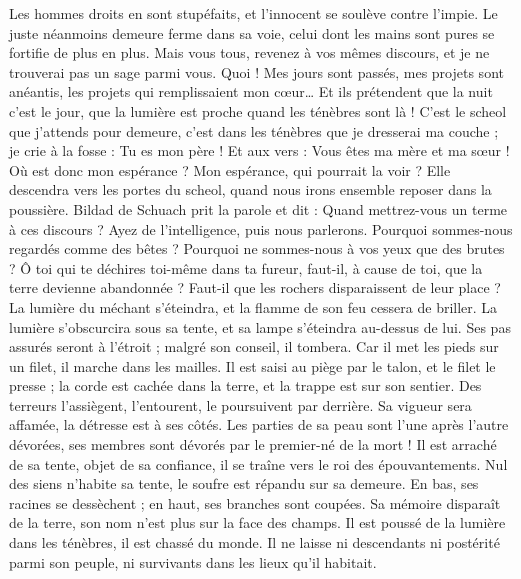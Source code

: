 \begin{multicols}{2}
Les hommes droits en sont stupéfaits, et l'innocent se soulève contre l'impie.
Le juste néanmoins demeure ferme dans sa voie, celui dont les mains sont pures se fortifie de plus en plus.
Mais vous tous, revenez à vos mêmes discours, et je ne trouverai pas un sage parmi vous.
Quoi ! Mes jours sont passés, mes projets sont anéantis, les projets qui remplissaient mon cœur…
Et ils prétendent que la nuit c'est le jour, que la lumière est proche quand les ténèbres sont là !
C'est le scheol que j'attends pour demeure, c'est dans les ténèbres que je dresserai ma couche ;
je crie à la fosse : Tu es mon père ! Et aux vers : Vous êtes ma mère et ma sœur !
Où est donc mon espérance ? Mon espérance, qui pourrait la voir ?
Elle descendra vers les portes du scheol, quand nous irons ensemble reposer dans la poussière.
\VerseOne{}Bildad de Schuach prit la parole et dit :
Quand mettrez-vous un terme à ces discours ? Ayez de l'intelligence, puis nous parlerons.
Pourquoi sommes-nous regardés comme des bêtes ? Pourquoi ne sommes-nous à vos yeux que des brutes ?
Ô toi qui te déchires toi-même dans ta fureur, faut-il, à cause de toi, que la terre devienne abandonnée ? Faut-il que les rochers disparaissent de leur place ?
La lumière du méchant s'éteindra, et la flamme de son feu cessera de briller.
La lumière s'obscurcira sous sa tente, et sa lampe s'éteindra au-dessus de lui.
Ses pas assurés seront à l'étroit ; malgré son conseil, il tombera.
Car il met les pieds sur un filet, il marche dans les mailles.
Il est saisi au piège par le talon, et le filet le presse ;
la corde est cachée dans la terre, et la trappe est sur son sentier.
Des terreurs l'assiègent, l'entourent, le poursuivent par derrière.
Sa vigueur sera affamée, la détresse est à ses côtés.
Les parties de sa peau sont l'une après l'autre dévorées, ses membres sont dévorés par le premier-né de la mort !
Il est arraché de sa tente, objet de sa confiance, il se traîne vers le roi des épouvantements.
Nul des siens n'habite sa tente, le soufre est répandu sur sa demeure.
En bas, ses racines se dessèchent ; en haut, ses branches sont coupées.
Sa mémoire disparaît de la terre, son nom n'est plus sur la face des champs.
Il est poussé de la lumière dans les ténèbres, il est chassé du monde.
Il ne laisse ni descendants ni postérité parmi son peuple, ni survivants dans les lieux qu'il habitait.

\end{multicols}
